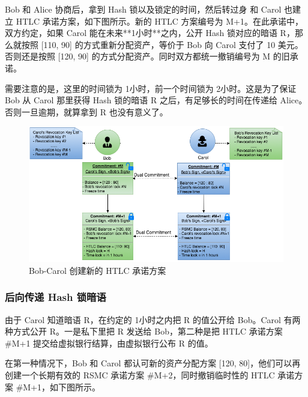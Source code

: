 \begin{appendices}
Bob 和 Alice 协商后，拿到 Hash 锁以及锁定的时间，然后转过身 和 Carol 也建立 HTLC 承诺方案，如下图所示。新的 HTLC 方案编号为 M+1。在此承诺中，双方约定，如果 Carol 能在未来**1小时**之内，公开 Hash 锁对应的暗语 R，那么就按照 [110, 90] 的方式重新分配资产，等价于 Bob 向 Carol 支付了 10 美元。否则还是按照 [120, 90] 的方式分配资产。同时双方都统一撤销编号为 M 的旧承诺。

需要注意的是，这里的时间锁为 1小时，前一个时间锁为 2小时。这是为了保证 Bob 从 Carol 那里获得 Hash 锁的暗语 R 之后，有足够长的时间在传递给 Alice。否则一旦逾期，就算拿到 R 也没有意义了。

\begin{figure}[h!]
    \centering
    \includegraphics[width=12cm, keepaspectratio]{../images/bob_carol_2.png}
    \caption{Bob-Carol 创建新的 HTLC 承诺方案}
    \label{fig:bob_carol_2}
\end{figure}

\subsubsection{后向传递 Hash 锁暗语}
由于 Carol 知道暗语 R，在约定的 1小时之内把 R 的值公开给 Bob。Carol 有两种方式公开 R。一是私下里把 R 发送给 Bob，第二种是把 HTLC 承诺方案 \#M+1 提交给虚拟银行结算，由虚拟银行公布 R 的值。

在第一种情况下，Bob 和 Carol 都认可新的资产分配方案 [120, 80]，他们可以再创建一个长期有效的 RSMC 承诺方案 \#M+2，同时撤销临时性的 HTLC 承诺方案 \#M+1，如下图所示。


\end{appendices}
